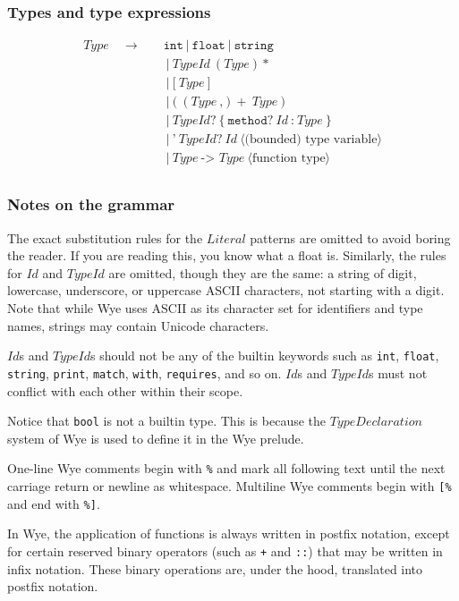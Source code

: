 \documentclass[a4paper, 12pt]{article}
\newcommand{\sepbar}{\: | \:}	%
\newcommand{\substo}{\quad\rightarrow\quad}
\renewcommand{\tt}{\texttt}
\newcommand{\la}{\langle}
\newcommand{\ra}{\rangle}
\begin{document}
\subsubsection{Types and type expressions}
\begin{align*}
Type \substo& \tt{int} \sepbar \tt{float} \sepbar \tt{string}\\
& \sepbar TypeId\: (Type)*\\
& \sepbar \tt{[}\:Type\:\tt{]}\\
& \sepbar \tt{(} \: (Type\: \tt{,} )+\: Type\: \tt{)}\\
& \sepbar TypeId? \: \tt{\{}\: \tt{method}?\: Id \: \tt{:}\: Type \: \tt{\}}\\
& \sepbar \texttt{'}\:TypeId?\: Id \: \la\text{(bounded) type variable}\ra\\
& \sepbar Type \: \tt{-> }Type\:\la\text{function type}\ra\\
\end{align*}
\subsubsection{Notes on the grammar}
The exact substitution rules for the $Literal$ patterns are omitted to avoid
boring the reader. If you are reading this, you know what a float is. Similarly,
the rules for $Id$ and $TypeId$ are omitted, though they are the same: a string
of digit, lowercase, underscore, or uppercase ASCII characters, not starting
with a digit. Note that while Wye uses ASCII as its character set for
identifiers and type names, strings may contain Unicode characters.

$Id$s and $TypeId$s should not be any of the builtin keywords such as
\tt{int}, \tt{float}, \tt{string}, \tt{print}, \tt{match},
\tt{with}, \tt{requires}, and so on. $Id$s and $TypeId$s must not conflict
with each other within their scope.

Notice that \tt{bool} is not a builtin type. This is because the
$TypeDeclaration$ system of Wye is used to define it in the Wye prelude.

One-line Wye comments begin with \tt{\%} and mark all following text until
the next carriage return or newline as whitespace. Multiline Wye comments begin
with \tt{[\%} and end with \tt{\%]}.

In Wye, the application of functions is always written in postfix notation,
except for certain reserved binary operators (such as \tt{+} and
\tt{::}) that may be written in infix notation. These binary operations are,
under the hood, translated into postfix notation.
\end{document}
